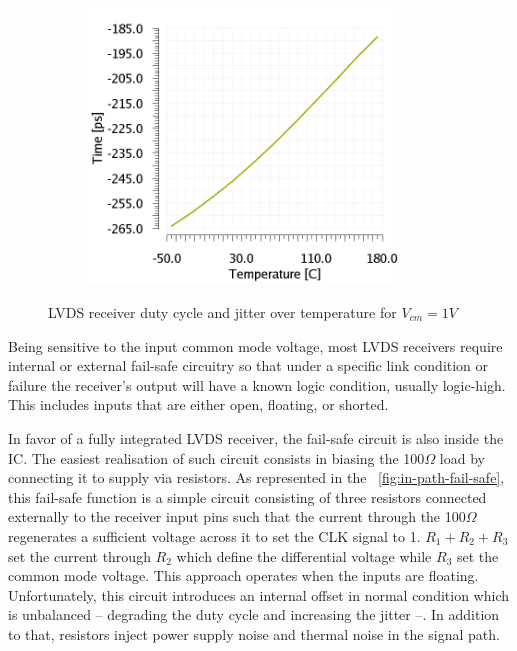 \begin{figure}[htp]
\begin{subfigure}[b]{0.32\textwidth}
        \includegraphics[width=0.9\textwidth]{Chapter5/Figs/lvds/ErrorClockPeriod-Vcm1V.png}
    \end{subfigure}
    \caption{LVDS receiver duty cycle and jitter over temperature for $V_{cm} = 1 V$}
    \label{fig:lvds-receiver-res1V}
\end{figure}

Being sensitive to the input common mode voltage, most LVDS receivers require internal or external fail-safe circuitry so that under a specific link condition or failure the receiver's output will have a known logic condition, usually logic-high. This includes inputs that are either open, floating, or shorted.

In favor of a fully integrated LVDS receiver, the fail-safe circuit is also inside the IC\@. The easiest realisation of such circuit consists in biasing the 100$\Omega$ load by connecting it to supply via resistors. As represented in the \figurename~\ref{fig:in-path-fail-safe}, this fail-safe function is a simple circuit consisting of three resistors connected externally to the receiver input pins such that the current through the 100$\Omega$ regenerates a sufficient voltage across it to set the CLK signal to 1. $R_1+R_2+R_3$ set the current through $R_2$ which define the differential voltage while $R_3$ set the common mode voltage. This approach operates when the inputs are floating. Unfortunately, this circuit introduces an internal offset in normal condition which is unbalanced -- degrading the duty cycle and increasing the jitter --. In addition to that, resistors inject power supply noise and thermal noise in the signal path.

